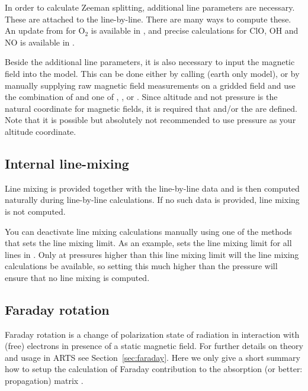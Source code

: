 In order to calculate Zeeman splitting, additional line parameters are necessary. These are attached to the
line-by-line.  There are many ways to compute these.  An update from \citet{larsson14:_treatment_jqsrt}
for O$_2$ is available in \citet{larsson19:_updated_jqsrt}, and precise calculations for {ClO}, {OH} and {NO} is
available in \citet{larsson20:_zeeman_jqsrt}.

Beside the additional line parameters, it is also necessary to input the magnetic
field into the model. This can be done either by calling  (earth only model),
or by manually supplying raw magnetic field measurements on a gridded field and use
the combination of  and one of , ,
or .  Since altitude and not pressure is the natural coordinate for magnetic fields,
it is required that  and/or the  are defined.  Note that it is possible but absolutely
not recommended to use pressure as your altitude coordinate.

\subsection{Internal line-mixing}
\label{sec:absorption:line-mixing}

Line mixing is provided together with the line-by-line data and is then computed naturally during line-by-line
calculations.  If no such data is provided, line mixing is not computed.

You can deactivate line mixing calculations manually using one of the methods that sets the line mixing limit.
As an example,  sets the line mixing limit for all lines in .
Only at pressures higher than this line mixing limit will the line mixing calculations be available, so setting this
much higher than the pressure will ensure that no line mixing is computed.

\subsection{Faraday rotation}
\label{sec:absorption:faraday}

Faraday rotation is a change of polarization state of radiation in interaction
with (free) electrons in presence of a static magnetic field. For further
details on theory and usage in ARTS see Section~\ref{sec:faraday}.
Here we only give a short summary how to setup the calculation of Faraday
contribution to the absorption (or better: propagation) matrix
.

